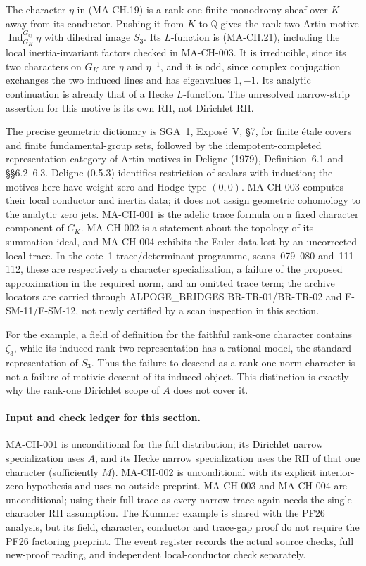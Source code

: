 The character $\eta$ in (MA-CH.19) is a rank-one finite-monodromy
sheaf over $K$ away from its conductor.  Pushing it from $K$
to $\mathbb Q$ gives the rank-two Artin motive
$\operatorname{Ind}_{G_K}^{G_{\mathbb Q}}\eta$ with dihedral
image $S_3$.  Its $L$-function is (MA-CH.21), including the
local inertia-invariant factors checked in MA-CH-003.
It is irreducible, since its two characters on $G_K$ are
$\eta$ and $\eta^{-1}$, and it is odd, since complex
conjugation exchanges the two induced lines and has
eigenvalues $1,-1$.  Its analytic continuation is already
that of a Hecke $L$-function.  The unresolved narrow-strip
assertion for this motive is its own RH, not Dirichlet RH.

The precise geometric dictionary is SGA~1, Expos\'e~V,
\S7, for finite \'etale covers and finite fundamental-group
sets, followed by the idempotent-completed representation
category of Artin motives in Deligne (1979), Definition~6.1
and \S\S6.2--6.3.  Deligne (0.5.3) identifies restriction of
scalars with induction; the motives here have weight zero
and Hodge type $(0,0)$.  MA-CH-003 computes their local
conductor and inertia data; it does not assign geometric
cohomology to the analytic zero jets.  MA-CH-001 is the
adelic trace formula on a fixed character component of
$C_K$.  MA-CH-002 is a statement about the topology of its
summation ideal, and MA-CH-004 exhibits the Euler data
lost by an uncorrected local trace.  In the cote~1
trace/determinant programme, scans~079--080 and~111--112,
these are respectively a character specialization, a
failure of the proposed approximation in the required norm,
and an omitted trace term; the archive locators are carried
through ALPOGE\_BRIDGES BR-TR-01/BR-TR-02 and F-SM-11/F-SM-12,
not newly certified by a scan inspection in this section.

For the example, a field of definition for the faithful
rank-one character contains $\zeta_3$, while its induced
rank-two representation has a rational model, the standard
representation of $S_3$.  Thus the failure to descend as a
rank-one norm character is not a failure of motivic descent
of its induced object.  This distinction is exactly why
the rank-one Dirichlet scope of $A$ does not cover it.

\paragraph{Input and check ledger for this section.}
MA-CH-001 is unconditional for the full distribution; its
Dirichlet narrow specialization uses $A$, and its Hecke
narrow specialization uses the RH of that one character
(sufficiently $M$).  MA-CH-002 is unconditional with its
explicit interior-zero hypothesis and uses no outside
preprint.  MA-CH-003 and MA-CH-004 are unconditional;
using their full trace as every narrow trace again needs
the single-character RH assumption.  The Kummer example
is shared with the PF26 analysis, but its field, character,
conductor and trace-gap proof do not require the PF26
factoring preprint.  The event register records the actual
source checks, full new-proof reading, and independent
local-conductor check separately.

